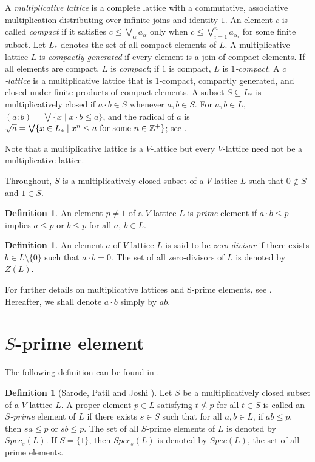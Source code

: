\documentclass[10pt,twoside,a4paper]{amsart}
\numberwithin{equation}{section}
\theoremstyle{plain}
\theoremstyle{definition}
\newtheorem{defn}[lem]{Definition}
\begin{document}
	A \textit{multiplicative lattice} is a complete lattice with a commutative, associative multiplication distributing over infinite joins and identity $1$.
	An element $c$ is called \textit{compact} if it satisfies $c\leq \bigvee _{\alpha }a_{\alpha }$ only when $c\leq \bigvee _{i=1}^na_{\alpha _i}$ for some finite subset. Let $L_*$ denotes the set of all compact elements of $L$. A multiplicative lattice $L$ is \textit{compactly generated} if every element is a join of compact elements. If all elements are compact, $L$ is \textit{compact}; if $1$ is compact, $L$ is \textit{$1$‑compact}. A \textit{$c$‑lattice} is a multiplicative lattice that is $1$‑compact, compactly generated, and closed under finite products of compact elements. A subset $S\subseteq L_*$ is multiplicatively closed if $a\cdot b\in S$ whenever $a,b\in S$. For $a,b\in L$, $(a:b)=\bigvee \{ x\mid x\cdot b\leq a\}$, and the radical of $a$ is $\sqrt{a}=\bigvee \{ x\in L_*\mid x^n\leq a\mathrm{\  for\  some\  }n\in \mathbb{Z^{\mathnormal{+}}}\}$; see \cite{AAJ, A, SJ, WD} .
		
	Note that a multiplicative  lattice  is a
	$V$-lattice  but  every $V$-lattice  need not be a multiplicative lattice. 
		
	Throughout, $S$ is a multiplicatively closed subset of a $V$-lattice $L$ such that $0\nin S$ and $1\in S$. 
		
	\begin{defn}
	An element $p \neq 1$ of a $V$-lattice $L$  is \textit{prime} element if $a	\cdot b \leq p$ implies $a \leq p$ or $b \leq p$ for all $a, ~b \in L$.  		
	\end{defn}
	
	\begin{defn} 
	An element $a$ of $V$-lattice $L$ is said to be \textit{zero-divisor} if there exists $b\in L\setminus \{0\}$ such that $a\cdot b=0$. The set of all zero-divisors of $L$ is denoted by $Z(L)$. 
	\end{defn}
		
	For further details on multiplicative lattices and S‑prime elements, see \cite{AAJ, A, D, JJJ, JS, S, SJ, WD}. Hereafter, we shall denote $a \cdot b$ simply by $ab$.
		
		
	\section{$S$-prime element}
		
	The following definition can be found in \cite{SPJ1}.
		
	\begin{defn}[Sarode, Patil and Joshi \cite{SPJ1}]
	Let $S$ be a multiplicatively closed subset of a $V$-lattice $L$. A proper element $p \in L$ satisfying $t \not\leq p$ for all $t \in S$ is called an \textit{$S$-prime} element of $L$ if there exists $s \in S$ 
	such that for all $a, b \in L$,   if $ab \leq p $, then  $sa \leq p \; \text{or} \; sb \leq p$.
	The set of all $S$-prime elements of $L$ is denoted by $Spec_s(L)$. If $S = \{1\}$, then $Spec_s(L)$ is denoted by $Spec(L)$, the set of all prime elements.
	\end{defn}
		
\end{document}
